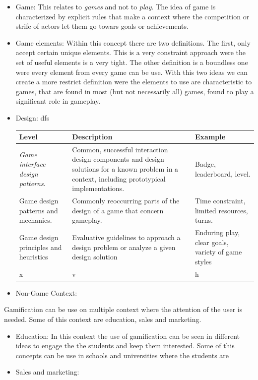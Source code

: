 \begin{itemize}

\item Game: This relates to \emph{games} and not to \emph{play}. The idea of game is
characterized by explicit rules that make a context where the competition or strife
of actors let them go towars goals or achievements.    

\item Game elements: Within this concept there are two definitions. The first,
only accept certain unique elements. This is a very constraint approach were the set
of useful elements is a very tight. The other definition is a boundless one were every
element from every game can be use. With this two ideas we can create a more restrict 
definition were the elements to use are characteristic to games, that are
found in most (but not necessarily all) games, found to play a significant role in gameplay. 

\item Design: dfs

\begin{center}
    \begin{tabular}{ | p{5cm} | p{5cm} | p{5cm} |}
    \hline
    Level & Description &  Example \\ \hline
    \emph{Game interface design patterns}. & 
    Common, successful interaction
    design components and design
    solutions for a known problem in
    a context, including prototypical
    implementations. &
    Badge, leaderboard, level. \\ \hline
    Game design patterns and
    mechanics. & 
    Commonly reoccurring parts of
    the design of a game that concern
    gameplay. &
    Time constraint,
    limited resources,
    turns. \\ \hline
    Game design principles and
    heuristics &
    Evaluative guidelines to approach
    a design problem or
    analyze a given design solution &
    Enduring play, clear goals, variety of
    game styles \\ \hline
    x & v & h \\ \hline

    \hline
    \end{tabular}
\end{center}

\item Non-Game Context:

\end{itemize}

Gamification can be use on multiple context where the attention of the user is needed. Some of this context are education, sales and marketing.

\begin{itemize}

\item Education: In this context the use of gamification can be seen in different ideas to engage the
the students and keep them interested. Some of this concepts can be use in schools and universities
where the students are 

\item Sales and marketing:

\end{itemize}

